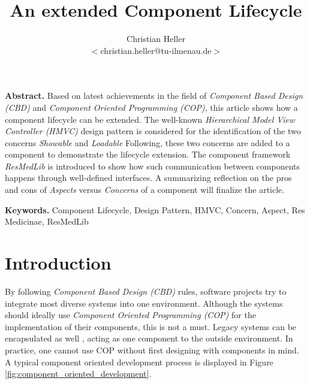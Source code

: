 \documentclass[a4paper,10pt]{llncs}
\begin{document}
\twocolumn

\title{An extended Component Lifecycle}
\author{Christian Heller\\
\(<\)christian.heller@tu-ilmenau.de\(>\)}
\maketitle
\bigskip

\begin{small}
\textbf{Abstract.}
Based on latest achievements in the field of \emph{Component Based Design (CBD)} and
\emph{Component Oriented Programming (COP)}, this article shows how a component
lifecycle can be extended.
The well-known \emph{Hierarchical Model View Controller (HMVC)} design pattern is
considered for the identification of the two concerns \emph{Showable} and \emph{Loadable}
Following, these two concerns are added to a component to demonstrate the
lifecycle extension.
The component framework \emph{ResMedLib} is introduced to show how such communication
between components happens through well-defined interfaces.
A summarizing reflection on the pros and cons of \emph{Aspects} versus \emph{Concerns}
of a component will finalize the article.
\end{small}
\bigskip

\begin{small}
\textbf{Keywords.}
Component Lifecycle, Design Pattern, HMVC, Concern, Aspect, Res Medicinae, ResMedLib
\end{small}

%
%
\section{Introduction}

By following \emph{Component Based Design (CBD)} rules, software projects try to integrate
most diverse systems into one environment. Although the systems should ideally use
\emph{Component Oriented Programming (COP)} for the implementation of their components,
this is not a must. Legacy systems can be encapsulated as well \cite{brown},
acting as one component to the outside environment.
In practice, one cannot use COP without first designing with components in mind.
A typical component oriented development process is displayed in Figure
\ref{fig:component_oriented_development}.
\end{document}
